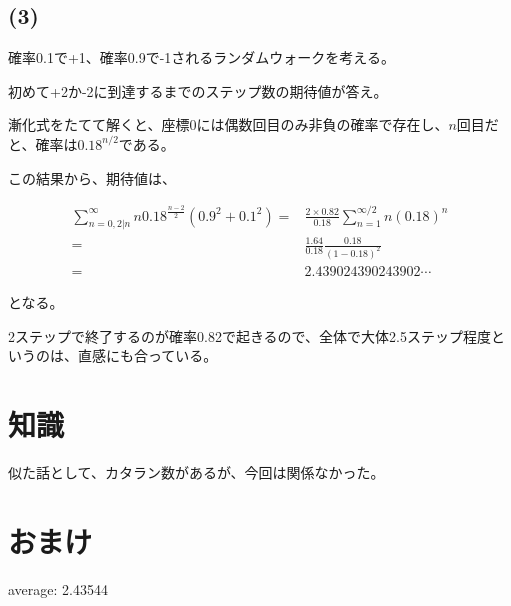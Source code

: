 \documentclass[a4paper, 10pt, dvipdfmx]{jlreq}
\begin{document}
\subsection*{(3)}

確率0.1で+1、確率0.9で-1されるランダムウォークを考える。

初めて+2か-2に到達するまでのステップ数の期待値が答え。

漸化式をたてて解くと、座標0には偶数回目のみ非負の確率で存在し、$n$回目だと、確率は$0.18^{n/2}$である。

この結果から、期待値は、

\begin{align*}
  \sum_{n=0,2|n}^{\infty}n 0.18^{\frac{n-2}{2}} (0.9^2+0.1^2) = & \frac{2\times 0.82}{0.18}\sum_{n=1}^{\infty/2}n(0.18)^n \\
  =                                                             & \frac{1.64}{0.18}\frac{0.18}{(1-0.18)^2}                \\
  =                                                             & 2.439024390243902\cdots
\end{align*}

となる。

2ステップで終了するのが確率0.82で起きるので、全体で大体2.5ステップ程度というのは、直感にも合っている。

\section{知識}

似た話として、カタラン数があるが、今回は関係なかった。

\section{おまけ}



average: 2.43544
\end{document}
